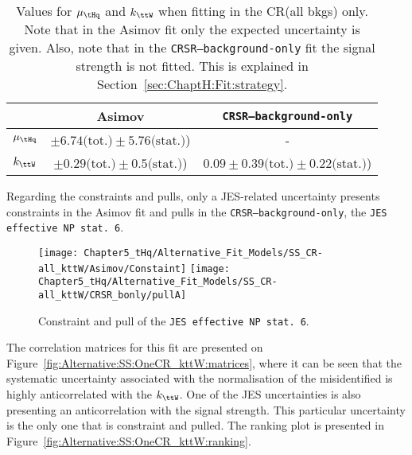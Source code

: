 \begin{table}[h]
\centering
\begin{tabular}{l|c|c}
\cline{2-3}
            		&   Asimov								&  \texttt{CRSR--background-only}       			\\ \midrule
$\mu_{\tHq}$ 	&  $\pm 6.74\text{(tot.)} \pm 5.76\text{(stat.)}$)        	&        -        \\
$k_{\ttW}$ 	&  $\pm 0.29\text{(tot.)} \pm 0.5\text{(stat.)}$)		&  $0.09\pm 0.39\text{(tot.)} \pm 0.22\text{(stat.)}$)        \\ \bottomrule
\end{tabular}
\caption{Values for $\mu_{\tHq}$ and $k_{\ttW}$ when fitting in the CR(all bkgs) only. 
Note that in the Asimov fit only the expected uncertainty is given. Also, note that in the \texttt{CRSR--background-only} fit the signal strength is not fitted.
This is explained in Section~\ref{sec:ChaptH:Fit:strategy}.}
\label{tab:Alternative:SS:OneCR_kttW:results}
\end{table}

Regarding the constraints and pulls, only a JES-related uncertainty presents constraints in the Asimov fit 
and pulls in the \texttt{CRSR--background-only}, the \texttt{JES effective NP stat. 6}.
\begin{figure}[h]
  \centering
  \texttt{[image: Chapter5\_tHq/Alternative\_Fit\_Models/SS\_CR-all\_kttW/Asimov/Constaint]}
  \texttt{[image: Chapter5\_tHq/Alternative\_Fit\_Models/SS\_CR-all\_kttW/CRSR\_bonly/pullA]}
\caption{Constraint and pull of the  \texttt{JES effective NP stat. 6}.}
\label{fig:Alternative:SS:OneCR_kttW:pull}
\end{figure}


The correlation matrices for this fit are presented on Figure~\ref{fig:Alternative:SS:OneCR_kttW:matrices}, 
where it can be seen that the systematic uncertainty associated with the normalisation of the misidentified
\tauhad is highly anticorrelated with the $k_{\ttW}$. 
One of the JES uncertainties is also presenting an anticorrelation with the  signal strength. This particular
uncertainty is the only one that is constraint and pulled.  
The ranking plot is presented in Figure~\ref{fig:Alternative:SS:OneCR_kttW:ranking}. 

